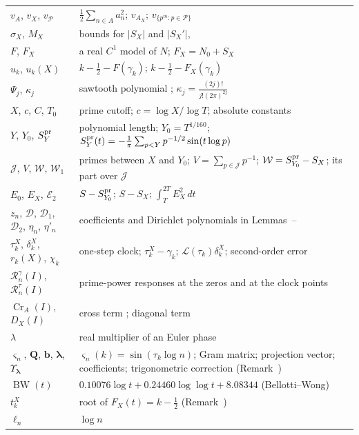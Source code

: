 \documentclass[preprint,12pt]{elsarticle}
\makeatletter
\let\CG@origref\ref
\let\CG@origeqref\eqref
\newcommand{\CG@gettip}[1]{\@ifundefined{CGTip@#1}{Reference: #1}{\csname CGTip@#1\endcsname}}
\DeclareRobustCommand{\CGref}[1]{\pdftooltip{\CG@origref{#1}}{\CG@gettip{#1}}}
\DeclareRobustCommand{\CGeqref}[1]{\pdftooltip{\CG@origeqref{#1}}{\CG@gettip{#1}}}
\numberwithin{equation}{section}
\theoremstyle{plain}
\theoremstyle{definition}
\theoremstyle{remark}
\newcommand{\NO}{N_0}
\newcommand{\lL}{\mathcal L}
\newcommand{\Cr}{\operatorname{Cr}}
\newcommand{\BW}{\operatorname{BW}}
\newcommand{\Rg}{\mathcal R^{\gamma}}
\newcommand{\Rt}{\mathcal R^{\tau}}
\newcommand{\PP}{\mathcal P}
\makeatother
\begin{document}
\begin{center}
\begin{longtable}{p{}p{}}
$v_A$, $v_X$, $v_\PP$ & $\frac12\sum_{n\in A}a_n^2$; $v_{A_X}$; $v_{\{p^m:p\in\PP\}}$\\
$\sigma_X$, $M_X$ & bounds for $|S_X|$ and $|S_X'|$, \CGeqref{eq:sigma_M_def}\\
$F$, $F_X$ & a real $C^1$ model of $N$; $F_X=\NO+S_X$\\
$u_k$, $u_k(X)$ & $k-\frac12-F(\gamma_k)$; $k-\frac12-F_X(\gamma_k)$\\
$\Psi_j$, $\kappa_j$ & sawtooth polynomial \CGeqref{eq:Psi_def}; $\kappa_j=\frac{(2j)!}{j!(2\pi)^{2j}}$\\
$X$, $c$, $C$, $T_0$ & prime cutoff; $c=\log X/\log T$; absolute constants\\
$Y$, $Y_0$, $S^{\rm pr}_Y$ & polynomial length; $Y_0=T^{1/160}$; $S^{\rm pr}_Y(t)=-\frac1\pi\sum_{p<Y}p^{-1/2}\sin(t\log p)$\\
$\mathcal J$, $V$, $\mathcal W$, $\mathcal W_1$ & primes between $X$ and $Y_0$; $V=\sum_{p\in\mathcal J}p^{-1}$; $\mathcal W=S^{\rm pr}_{Y_0}-S_X$; its part over $\mathcal J$ \CGeqref{eq:D_def}\\
$E_0$, $E_X$, $\mathcal E_2$ & $S-S^{\rm pr}_{Y_0}$; $S-S_X$; $\int_T^{2T}E_X^2\,dt$\\
$z_n$, $\mathcal D$, $\mathcal D_1$, $\mathcal D_2$, $\eta_n$, $\eta'_n$ & coefficients and Dirichlet polynomials in Lemmas~\CGref{lem:trig_MV}--\CGref{lem:D_moments}\\
$\tau_k^X$, $\delta_k^X$, $r_k(X)$, $\chi_k$ & one-step clock; $\tau_k^X-\gamma_k$; $\lL(\tau_k)\delta_k^X$; second-order error \CGeqref{eq:one_step_decomposition}\\
$\Rg_n(I)$, $\Rt_n(I)$ & prime-power responses at the zeros and at the clock points \CGeqref{eq:two_responses}\\
$\Cr_A(I)$, $D_X(I)$ & cross term \CGeqref{eq:Cr_def}; diagonal term \CGeqref{eq:full_factor_gain}\\
$\lambda$ & real multiplier of an Euler phase\\
$\varsigma_n$, $\mathbf Q$, $\mathbf b$, $\boldsymbol\lambda$, $\Upsilon_{\boldsymbol\lambda}$ & $\varsigma_n(k)=\sin(\tau_k\log n)$; Gram matrix; projection vector; coefficients; trigonometric correction (Remark~\CGref{rem:matrix_projection})\\
$\BW(t)$ & $0.10076\log t+0.24460\log\log t+8.08344$ (Bellotti--Wong)\\
$t_k^X$ & root of $F_X(t)=k-\frac12$ (Remark~\CGref{rem:localization})\\
$\ell_n$ & $\log n$\\

\end{longtable}
\end{center}
\end{document}
